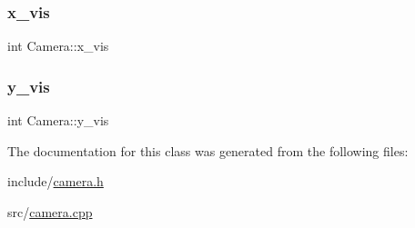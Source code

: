 \subsubsection{\texorpdfstring{x\+\_\+vis}{x\_vis}}
{\footnotesize\ttfamily int Camera\+::x\+\_\+vis\hspace{0.3cm}{\ttfamily [private]}}

\mbox{\label{classCamera_a52e161a09b8e26feb580cc1740abcdad}} 
\subsubsection{\texorpdfstring{y\+\_\+vis}{y\_vis}}
{\footnotesize\ttfamily int Camera\+::y\+\_\+vis\hspace{0.3cm}{\ttfamily [private]}}



The documentation for this class was generated from the following files\+:\begin{DoxyCompactItemize}
\item 
include/\hyperlink{camera_8h}{camera.\+h}\item 
src/\hyperlink{camera_8cpp}{camera.\+cpp}\end{DoxyCompactItemize}
